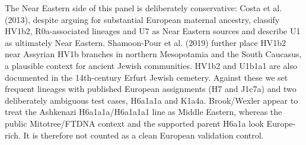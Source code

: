 \documentclass[11pt]{article}
\begin{document}
The Near Eastern side of this panel is deliberately conservative: Costa et al. (2013), despite arguing for substantial European maternal ancestry, classify HV1b2, R0a-associated lineages and U7 as Near Eastern sources and describe U1 as ultimately Near Eastern. Shamoon-Pour et al. (2019) further place HV1b2 near Assyrian HV1b branches in northern Mesopotamia and the South Caucasus, a plausible context for ancient Jewish communities. HV1b2 and U1b1a1 are also documented in the 14th-century Erfurt Jewish cemetery. Against these we set frequent lineages with published European assignments (H7 and J1c7a) and two deliberately ambiguous test cases, H6a1a1a and K1a4a. Brook/Wexler appear to treat the Ashkenazi H6a1a1a/H6a1a1a1 line as Middle Eastern, whereas the public Mitotree/FTDNA context and the supported parent H6a1a look Europe-rich. It is therefore not counted as a clean European validation control.
\end{document}
